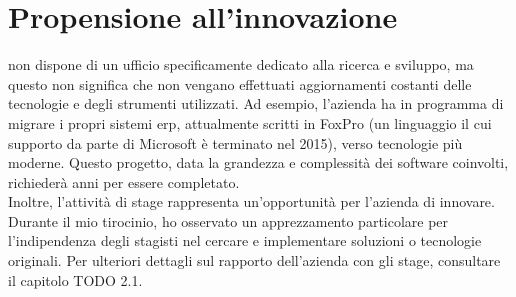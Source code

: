 \section{Propensione all'innovazione}\label{chap:Propensione all'innovazione}
{\company} non dispone di un ufficio specificamente dedicato alla ricerca e sviluppo, ma questo non significa che non 
vengano effettuati aggiornamenti costanti delle tecnologie e degli strumenti utilizzati. Ad esempio, l'azienda ha 
in programma di migrare i propri sistemi \gls{erp}, attualmente scritti in FoxPro (un linguaggio il cui supporto da 
parte di Microsoft è terminato nel 2015), verso tecnologie più moderne. Questo progetto, data la grandezza e 
complessità dei software coinvolti, richiederà anni per essere completato.\\
Inoltre, l'attività di stage rappresenta un'opportunità per l'azienda di innovare. Durante il mio tirocinio, 
ho osservato un apprezzamento particolare per l'indipendenza degli stagisti nel cercare e implementare 
soluzioni o tecnologie originali. Per ulteriori dettagli sul rapporto dell'azienda con gli stage, consultare il 
capitolo TODO 2.1.

